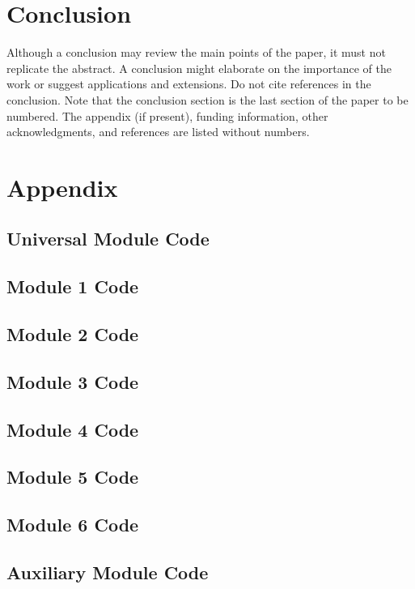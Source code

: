 \documentclass[conf]{new-aiaa} %
\begin{document}
\section{Conclusion}
Although a conclusion may review the main points of the paper, it must not replicate the abstract. A conclusion might elaborate on the importance of the work or suggest applications and extensions. Do not cite references in the conclusion. Note that the conclusion section is the last section of the paper to be numbered. The appendix (if present), funding information, other acknowledgments, and references are listed without numbers.


\section*{Appendix}
\subsection{Universal Module Code}


\subsection{Module 1 Code}


\subsection{Module 2 Code}


\subsection{Module 3 Code}


\subsection{Module 4 Code}


\subsection{Module 5 Code}


\subsection{Module 6 Code}


\subsection{Auxiliary Module Code}




\end{document}
